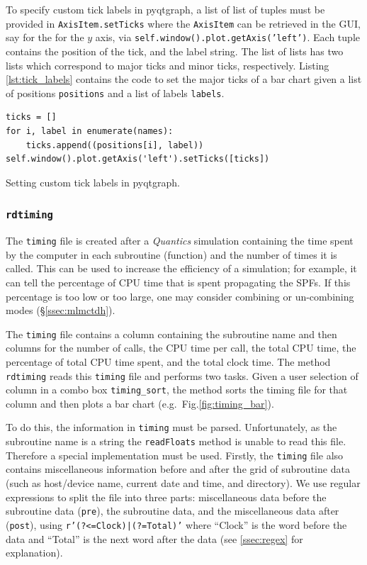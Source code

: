 \documentclass[12pt]{article}
\newenvironment{code}{\captionsetup{type=listing}}{\par\addvspace{\baselineskip}}
\begin{document}
To specify custom tick labels in pyqtgraph, a list of list of tuples must be provided in \texttt{AxisItem.setTicks} where the \texttt{AxisItem} can be retrieved in the GUI, say for the for the \(y\) axis, via \texttt{self.window().plot.getAxis('left')}. Each tuple contains the position of the tick, and the label string. The list of lists has two lists which correspond to major ticks and minor ticks, respectively. Listing \ref{lst:tick_labels} contains the code to set the major ticks of a bar chart given a list of positions \texttt{positions} and a list of labels \texttt{labels}.

\begin{code}\begin{verbatim}
ticks = []
for i, label in enumerate(names):
    ticks.append((positions[i], label))
self.window().plot.getAxis('left').setTicks([ticks])
\end{verbatim}
\caption{Setting custom tick labels in pyqtgraph.}
\label{lst:tick_labels}
\end{code}

\subsubsection{\texttt{rdtiming}}\label{sssec:rdtiming}

The \texttt{timing} file is created after a \textit{Quantics} simulation containing the time spent by the computer in each subroutine (function) and the number of times it is called. This can be used to increase the efficiency of a simulation; for example, it can tell the percentage of CPU time that is spent propagating the SPFs. If this percentage is too low or too large, one may consider combining or un-combining modes (\S\ref{ssec:mlmctdh}).

The \texttt{timing} file contains a column containing the subroutine name and then columns for the number of calls, the CPU time per call, the total CPU time, the percentage of total CPU time spent, and the total clock time. The method \texttt{rdtiming} reads this \texttt{timing} file and performs two tasks. Given a user selection of column in a combo box \texttt{timing\_sort}, the method sorts the timing file for that column and then plots a bar chart (e.g.~Fig.\ref{fig:timing_bar}). 

To do this, the information in \texttt{timing} must be parsed. Unfortunately, as the subroutine name is a string the \texttt{readFloats} method is unable to read this file. Therefore a special implementation must be used. Firstly, the \texttt{timing} file also contains miscellaneous information before and after the grid of subroutine data (such as host/device name, current date and time, and directory). We use regular expressions to split the file into three parts: miscellaneous data before the subroutine data (\texttt{pre}), the subroutine data, and the miscellaneous data after (\texttt{post}), using \texttt{r'(?<=Clock)\n|\n(?=Total)'} where ``Clock'' is the word before the data and ``Total'' is the next word after the data (see \ref{ssec:regex} for explanation).
\end{document}
